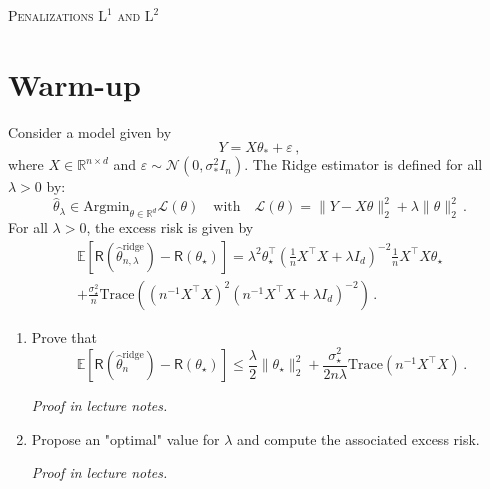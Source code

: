 \documentclass[a4paper,10pt,fleqn]{article}
\newcommand{\eqsp}{\,}
\newcommand{\1}{\ensuremath{\mathbbm{1}}}
\newcommand{\bE}{\mathbb{E}}
\newcommand{\param}{\theta}
\begin{document}
\noindent\hrulefill

\begin{center}
\textsc{Penalizations $\mathrm{L}^1$ and $\mathrm{L}^2$}
\end{center}
\hrulefill

\medskip

\section{Warm-up}
Consider a model given by 
$$
Y = X\theta_* + \varepsilon\,,
$$
where $X\in\mathbb{R}^{n\times d}$ and $\varepsilon \sim \mathcal{N}(0,\sigma_*^2I_n)$. The Ridge estimator  is defined for all $\lambda>0$ by:
$$
\widehat{\theta}_{\lambda}\in\mathrm{Argmin}_{\theta\in\mathbb{R}^d} \mathcal{L}(\theta)\quad\mathrm{with} \quad \mathcal{L}(\theta) = \|Y-X\theta\|_2^2 + \lambda \|\theta\|_2^2\,.
 $$
For all $\lambda>0$, the excess risk is given by
\begin{multline*}
\bE\left[\mathsf{R}(\widehat \param^{\mathrm{ridge}}_{n,\lambda}) - \mathsf{R}(\param_\star)\right] = \lambda^2\param_\star^\top\left(\frac{1}{n}X^\top X + \lambda I_d\right)^{-2} \frac{1}{n}X^\top X \param_\star \\
+\frac{\sigma_\star^{2}}{n}\mathrm{Trace}\left((n^{-1}X^\top X)^2(n^{-1}X^\top X + \lambda I_d)^{-2}\right)\eqsp.
\end{multline*}

\begin{enumerate}
\item Prove that 
$$
\bE\left[\mathsf{R}(\widehat \param^{\mathrm{ridge}}_n) - \mathsf{R}(\param_\star)\right]  \leqslant \frac{\lambda}{2}\|\param_\star\|_2^2 + \frac{\sigma_\star^{2}}{2n\lambda}\mathrm{Trace}\left(n^{-1}X^\top X\right)\eqsp.
$$

\vspace{.2cm}

{\em
Proof in  lecture notes.
}

\item Propose an "optimal" value for $\lambda$ and  compute the associated excess risk.

\vspace{.2cm}

{\em
Proof in  lecture notes.
}
\end{enumerate}
\end{document}

